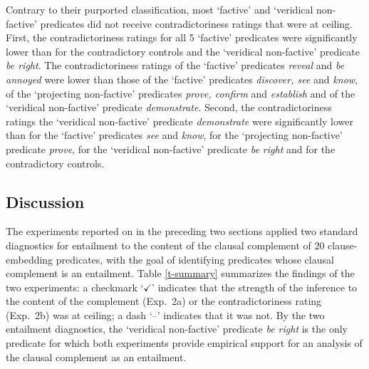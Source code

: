 \documentclass[11pt,fleqn]{article}
\newcommand{\6}{\mbox{$[\hspace*{-.6mm}[$}}
\newcommand{\9}{\mbox{$]\hspace*{-.6mm}]$}}
\begin{document}
{Contrary to their purported classification, most `factive' and `veridical non-factive' predicates did not receive contradictoriness ratings that were at ceiling. First, the contradictoriness ratings for all 5 `factive' predicates were significantly lower than for the contradictory controls and the `veridical non-factive' predicate {\em be right}. The contradictoriness ratings of the `factive' predicates {\em reveal} and {\em be annoyed} were lower than those of the `factive' predicates {\em discover, see} and {\em know}, of the `projecting non-factive' predicates {\em prove, confirm} and {\em establish} and of the `veridical non-factive' predicate {\em demonstrate}. Second, the contradictoriness ratings the `veridical non-factive' predicate {\em demonstrate} were significantly lower than for the `factive' predicates {\em see} and {\em know}, for the `projecting non-factive' predicate {\em prove}, for the `veridical non-factive' predicate {\em be right} and for the contradictory controls. 

\subsection{Discussion}\label{s33}

The experiments reported on in the preceding two sections applied two standard diagnostics for entailment to the content of the clausal complement of 20 clause-embedding predicates, with the goal of identifying predicates whose clausal complement is an entailment. Table \ref{t-summary} summarizes the findings of the two experiments: a checkmark `$\checkmark$' indicates that the strength of the inference to the content of the complement (Exp.~2a) or the contradictoriness rating (Exp.~2b) was at ceiling; a dash `--' indicates that it was not. By the two entailment diagnostics, the `veridical non-factive' predicate {\em be right} is the only predicate for which both experiments provide empirical support for an analysis of the clausal complement as an entailment. 

\begin{table}[h!]

\centering
\small

\begin{tabular}{r c c c c c c c c c c c c c c c c c c c c}


\end{tabular}
\end{table}}
\end{document}
